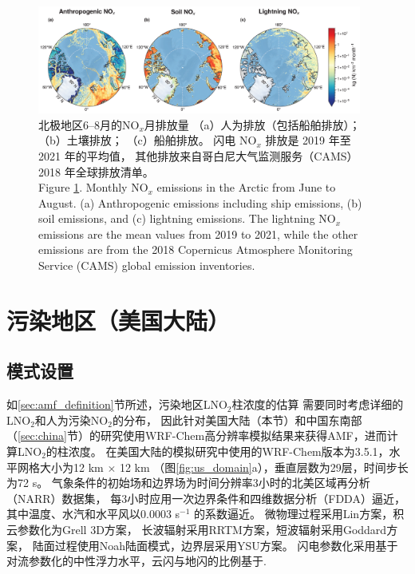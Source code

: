 \begin{figure}[H]
\centering
\includegraphics[width=0.95\textwidth]{./figures/arctic_emission_comp.png}
\caption{
北极地区6--8月的NO$_x$月排放量
（a）人为排放（包括船舶排放）；（b）土壤排放；
（c）船舶排放。
闪电 NO$_x$ 排放是 2019 年至 2021 年的平均值，
其他排放来自哥白尼大气监测服务（CAMS）2018 年全球排放清单。\\
Figure \ref{fig:arctic_emission_comp}. Monthly NO$_x$ emissions in the Arctic from June to August.
(a) Anthropogenic emissions including ship emissions, (b) soil emissions, and (c) lightning emissions.
The lightning NO$_x$ emissions are the mean values from 2019 to 2021, while the other emissions are from the 2018 Copernicus Atmosphere Monitoring Service (CAMS) global emission inventories.
}
\label{fig:arctic_emission_comp}
\end{figure}


\section{污染地区（美国大陆）} \label{sec:us}

\subsection{模式设置} \label{sec:model_settings_us}

如\ref{sec:amf_definition}节所述，污染地区LNO$_2$柱浓度的估算
需要同时考虑详细的LNO$_2$和人为污染NO$_2$的分布，
因此针对美国大陆（本节）和中国东南部（\ref{sec:china}节）的研究使用WRF-Chem高分辨率模拟结果来获得AMF，进而计算LNO$_2$的柱浓度。
在美国大陆的模拟研究中使用的WRF-Chem版本为3.5.1，水平网格大小为12 km $\times$ 12 km （图\ref{fig:us_domain}a），垂直层数为29层，时间步长为72 s。
气象条件的初始场和边界场为时间分辨率3小时的北美区域再分析（NARR）数据集，
每3小时应用一次边界条件和四维数据分析（FDDA）逼近，
其中温度、水汽和水平风以0.0003 s$^{-1}$ 的系数逼近\citep{Laughner.2017}。
微物理过程采用Lin方案\citep{Lin.1983}，积云参数化为Grell 3D方案\citep{Grell.1993a,Grell.2002a}，
长波辐射采用RRTM方案\citep{Iacono.2008}，短波辐射采用Goddard方案，
陆面过程使用Noah陆面模式\citep{Koren.1999}，边界层采用YSU方案\citep{Hong.2006}。
闪电参数化采用基于对流参数化的中性浮力水平\citep{Pickering.1992}，云闪与地闪的比例基于\citet{Boccippio.2001}.

